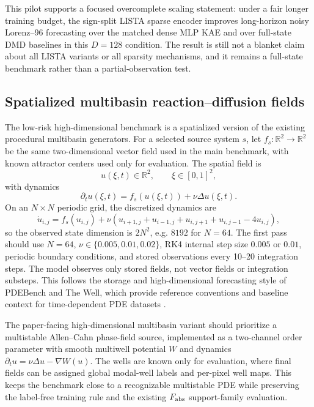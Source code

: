 This pilot supports a focused overcomplete scaling statement: under a fair longer training budget, the sign-split LISTA sparse encoder improves long-horizon noisy Lorenz--96 forecasting over the matched dense MLP KAE and over full-state DMD baselines in this \(D=128\) condition. The result is still not a blanket claim about all LISTA variants or all sparsity mechanisms, and it remains a full-state benchmark rather than a partial-observation test.

\subsection{Spatialized multibasin reaction--diffusion fields}
\label{app:spatialized_multibasin_pde}

The low-risk high-dimensional benchmark is a spatialized version of the existing procedural multibasin generators. For a selected source system \(s\), let \(f_s:\mathbb{R}^2\to\mathbb{R}^2\) be the same two-dimensional vector field used in the main benchmark, with known attractor centers used only for evaluation. The spatial field is
\begin{equation}
  u(\xi,t)\in\mathbb{R}^2,\qquad \xi\in[0,1]^2,
\end{equation}
with dynamics
\begin{equation}
  \partial_t u(\xi,t)=f_s(u(\xi,t))+\nu\Delta u(\xi,t).
  \label{eq:spatialized_pde}
\end{equation}
On an \(N\times N\) periodic grid, the discretized dynamics are
\begin{equation}
  \dot u_{i,j}
  =
  f_s(u_{i,j})
  +
  \nu\left(
    u_{i+1,j}+u_{i-1,j}+u_{i,j+1}+u_{i,j-1}-4u_{i,j}
  \right),
  \label{eq:spatialized_grid}
\end{equation}
so the observed state dimension is \(2N^2\), e.g. \(8192\) for \(N=64\). The first pass should use \(N=64\), \(\nu\in\{0.005,0.01,0.02\}\), RK4 internal step size \(0.005\) or \(0.01\), periodic boundary conditions, and stored observations every 10--20 integration steps. The model observes only stored fields, not vector fields or integration substeps. This follows the storage and high-dimensional forecasting style of PDEBench and The Well, which provide reference conventions and baseline context for time-dependent PDE datasets \citep{takamoto_pdebench_2022,ohana_well_2024}.

The paper-facing high-dimensional multibasin variant should prioritize a multistable Allen--Cahn phase-field source, implemented as a two-channel order parameter with smooth multiwell potential \(W\) and dynamics \(\partial_t u=\nu\Delta u-\nabla W(u)\). The wells are known only for evaluation, where final fields can be assigned global modal-well labels and per-pixel well maps. This keeps the benchmark close to a recognizable multistable PDE while preserving the label-free training rule and the existing \(F_{\rm abs}\) support-family evaluation.

